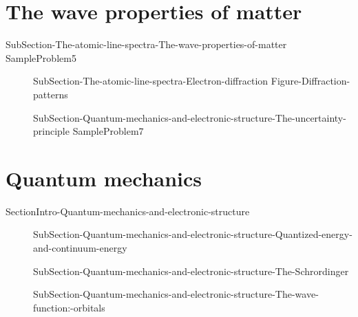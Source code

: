 \documentclass[main.tex]{subfiles}
\newcommand\chapterlabel{Ch-radiation}\setcounter{figurenewcounter}{0}\setcounter{tablenewcounter}{0}\setcounter{formulanewcounter}{0}\chapterpicture{../{\chapterlabel}/figure1}\chapterpicturelabel{PngImg}
\begin{document}
\section{The wave properties of matter}{SubSection-The-atomic-line-spectra-The-wave-properties-of-matter}
 \hspace{-9em}{Figure-Debroglie}
{SampleProblem5}
\sloppy\begin{description}
\item[]{SubSection-The-atomic-line-spectra-Electron-diffraction}
{Figure-Diffraction-patterns}
\item[] {SubSection-Quantum-mechanics-and-electronic-structure-The-uncertainty-principle}
{SampleProblem7}
\end{description}


\section{Quantum mechanics}{SectionIntro-Quantum-mechanics-and-electronic-structure}
\sloppy\begin{description}
\item[] {SubSection-Quantum-mechanics-and-electronic-structure-Quantized-energy-and-continuum-energy}
\item[] {SubSection-Quantum-mechanics-and-electronic-structure-The-Schrordinger}
\item[] {SubSection-Quantum-mechanics-and-electronic-structure-The-wave-function:-orbitals}
\end{description}


\end{document}
